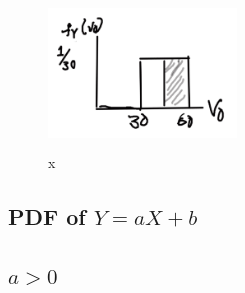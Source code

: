 
\begin{figure}[ht]
\centering
\includegraphics[width=5cm, height=4cm]{images/L10/joan_drives.jpeg}
\caption{x}
\end{figure}

\subsection{PDF of \texorpdfstring{$Y=aX + b$}{Y} }


\subsection{\texorpdfstring{$a > 0$}{a}}

